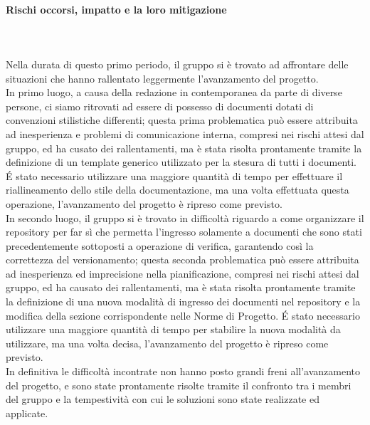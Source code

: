 \paragraph{Rischi occorsi, impatto e la loro mitigazione} \hspace{1cm} 
\\ \hspace{1cm} \\
Nella durata di questo primo periodo, il gruppo si è trovato ad affrontare delle situazioni che hanno rallentato leggermente l'avanzamento del progetto.\\
In primo luogo, a causa della redazione in contemporanea da parte di diverse persone, ci siamo ritrovati ad essere di possesso di documenti dotati di convenzioni stilistiche differenti; questa prima problematica può essere attribuita ad inesperienza e problemi di comunicazione interna, compresi nei rischi attesi dal gruppo, ed ha cusato dei rallentamenti, ma è stata risolta prontamente tramite la definizione di un template generico utilizzato per la stesura di tutti i documenti. \'E stato necessario utilizzare una maggiore quantità di tempo per effettuare il riallineamento dello stile della documentazione, ma una volta effettuata questa operazione, l'avanzamento del progetto è ripreso come previsto.\\
In secondo luogo, il gruppo si è trovato in difficoltà riguardo a come organizzare il repository per far sì che permetta l'ingresso solamente a documenti che sono stati precedentemente sottoposti a operazione di verifica, garantendo così la correttezza del versionamento; questa seconda problematica può essere attribuita ad inesperienza ed imprecisione nella pianificazione, compresi nei rischi attesi dal gruppo, ed ha causato dei rallentamenti, ma è stata risolta prontamente tramite la definizione di una nuova modalità di ingresso dei documenti nel repository e la modifica della sezione corrispondente nelle Norme di Progetto. \'E stato necessario utilizzare una maggiore quantità di tempo per stabilire la nuova modalità da utilizzare, ma una volta decisa, l'avanzamento del progetto è ripreso come previsto.\\
In definitiva le difficoltà incontrate non hanno posto grandi freni all'avanzamento del progetto, e sono state prontamente risolte tramite il confronto tra i membri del gruppo e la tempestività con cui le soluzioni sono state realizzate ed applicate.

